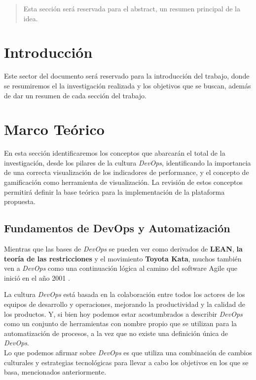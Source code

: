 \documentclass[journal]{IEEEtran}
\begin{document}
\begin{abstract}
    Esta sección será reservada para el abstract, un resumen principal de la idea.
\end{abstract}

\section{\textbf{\Large Introducción}}
Este sector del documento será reservado para la introducción del trabajo, donde se resumiremos el la investigación realizada y los objetivos que se buscan, además de dar un resumen de cada sección del trabajo.

\section{\textbf{\Large Marco Teórico}}

En esta sección identificaremos los conceptos que abarcarán el total de la investigación, desde los pilares de la cultura \textit{DevOps}, identificando la importancia de una correcta visualización de los indicadores de performance, y el concepto de gamificación como herramienta de visualización. La revisión de estos conceptos permitirá definir la base teórica para la implementación de la plataforma propuesta.

\subsection{\textbf{Fundamentos de DevOps y Automatización}}

\begin{tcolorbox}[colback=gray!10, colframe=black, left=2mm, right=2mm]
    \small %
    \ttfamily %
    \raggedright %
    Mientras que las bases de \textit{DevOps} se pueden ver como derivados de \textbf{LEAN}, \textbf{la teoría de las restricciones} y el movimiento \textbf{Toyota Kata}, muchos también ven a \textit{DevOps} como una continuación lógica al camino del software Agile que inició en el año 2001 \cite{kim2021devops}.
\end{tcolorbox}

La cultura \textit{DevOps} está basada en la colaboración entre todos los actores de los equipos de desarrollo y operaciones, mejorando la productividad y la calidad de los productos. Y, si bien hoy podemos estar acostumbrados a describir \textit{DevOps} como un conjunto de herramientas con nombre propio que se utilizan para la automatización de procesos, a la vez que no existe una definición única de \textit{DevOps}.
\\Lo que podemos afirmar sobre \textit{DevOps} es que utiliza una combinación de cambios culturales y estrategias tecnológicas para llevar a cabo los objetivos en los que se basa, mencionados anteriormente.
\end{document}
